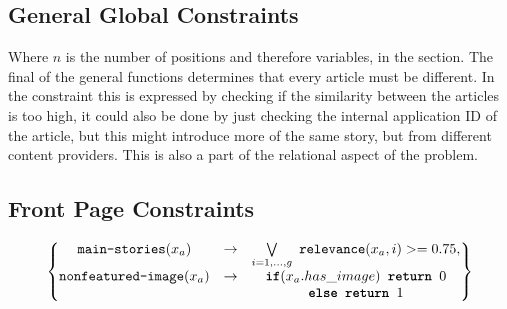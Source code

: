 \subsection*{General Global Constraints}
\vspace{-30pt}
Where $n$ is the number of positions and therefore variables, in the section. The final of the general functions determines that every article must be different. In the constraint this is expressed by checking if the similarity between the articles is too high, it could also be done by just checking the internal application ID of the article, but this might introduce more of the same story, but from different content providers. This is also a part of the relational aspect of the problem.

\subsection*{Front Page Constraints}
\hspace{-30pt}
\begin{minipage}{.9\largefigure}
\vspace{-30pt}
\begin{align}
	\begin{Bmatrix}
		\texttt{main-stories}(x_a) &\rightarrow& \bigvee\limits_{i=1,\dots,g}\ \texttt{relevance}(x_a,i) >= 0.75,\\
		\texttt{nonfeatured-image}(x_a) &\rightarrow& \texttt{\textbf{if}}(x_a.has\_image) \texttt{\textbf{ return }}0\\
		&&\texttt{\textbf{else return }}1
	\end{Bmatrix}
\end{align}
\end{minipage}

